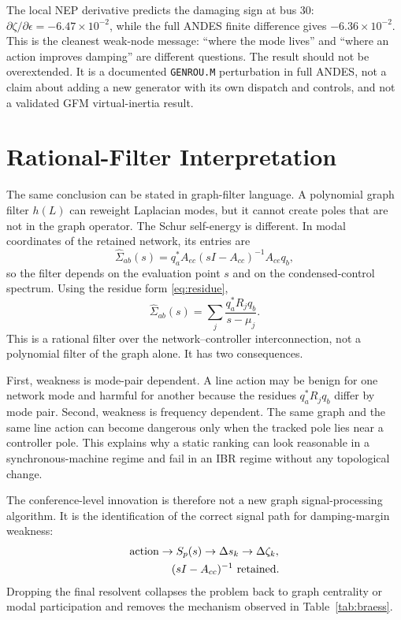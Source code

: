 \documentclass[conference]{IEEEtran}
\begin{document}
The local NEP derivative predicts the damaging sign at bus 30:
$\partial\zeta/\partial\epsilon=-6.47\times10^{-2}$, while the full ANDES finite
difference gives $-6.36\times10^{-2}$. This is the cleanest weak-node message:
``where the mode lives'' and ``where an action improves damping'' are different
questions. The result should not be overextended. It is a documented
\texttt{GENROU.M} perturbation in full ANDES, not a claim about adding a new
generator with its own dispatch and controls, and not a validated GFM
virtual-inertia result.

\section{Rational-Filter Interpretation}

The same conclusion can be stated in graph-filter language. A polynomial graph filter $h(L)$ can reweight Laplacian modes, but it cannot create poles that are not in the graph operator. The Schur self-energy is different. In modal coordinates of the retained network, its entries are
\begin{equation}
  \widehat\Sigma_{ab}(s)=
  q_a^\ast A_{ec}(sI-A_{cc})^{-1}A_{ce}q_b ,
  \label{eq:modalself}
\end{equation}
so the filter depends on the evaluation point $s$ and on the condensed-control spectrum. Using the residue form \eqref{eq:residue},
\begin{equation}
  \widehat\Sigma_{ab}(s)=
  \sum_j \frac{q_a^\ast R_j q_b}{s-\mu_j}.
  \label{eq:rationalfilter}
\end{equation}
This is a rational filter over the network--controller interconnection, not a polynomial filter of the graph alone. It has two consequences.

First, weakness is mode-pair dependent. A line action may be benign for one network mode and harmful for another because the residues $q_a^\ast R_j q_b$ differ by mode pair. Second, weakness is frequency dependent. The same graph and the same line action can become dangerous only when the tracked pole lies near a controller pole. This explains why a static ranking can look reasonable in a synchronous-machine regime and fail in an IBR regime without any topological change.

The conference-level innovation is therefore not a new graph signal-processing algorithm. It is the identification of the correct signal path for damping-margin weakness:
\begin{equation}
\begin{aligned}
  \text{action}
  &\rightarrow S_p(s)
  \rightarrow \Delta s_k
  \rightarrow \Delta\zeta_k,\\
  &\hspace{4mm}(sI-A_{cc})^{-1}\ \text{retained.}
\end{aligned}
\label{eq:signalpath}
\end{equation}
Dropping the final resolvent collapses the problem back to graph centrality or modal participation and removes the mechanism observed in Table~\ref{tab:braess}.
\end{document}

